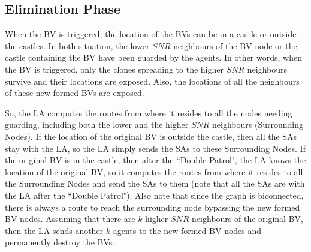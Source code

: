 \subsection{ Elimination Phase}

When the BV is triggered,   the location of the BVs can be in a castle or outside the castles. In both situation, the lower $SNR$ neighbours of the BV node or the castle containing the BV have been guarded by the agents. In other words, when the BV is triggered, only the clones spreading to the higher $SNR$ neighbours %
survive and their locations are exposed. Also, the locations of all the neighbours of these new formed BVs are exposed. 

So, the LA computes the routes from where it resides to all the nodes needing guarding, including both  the lower and the higher $SNR$ neighbours   (Surrounding Nodes). If the location of the original BV is outside the castle, then all the SAs stay  with the LA, so the LA simply sends the SAs to these Surrounding Nodes. If the original BV is in the castle, then after the  ``Double Patrol", the LA knows the location of the original BV, so it computes the routes from where it resides to all the Surrounding Nodes and send the SAs to them (note that all the SAs are with the LA after the  ``Double Patrol"). Also note that since the graph is biconnected, there is always a route to reach the surrounding node bypassing the new formed BV nodes. 
Assuming that there are $k$ higher $SNR$ neighbours of the original BV, then   the LA sends another $k$ agents to the new formed BV nodes and permanently destroy the BVs.

\color{blue}
